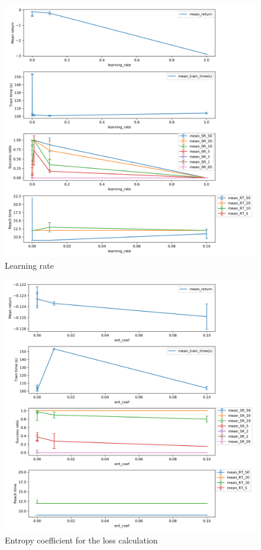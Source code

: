 \documentclass{article}
\begin{document}
\begin{figure}[H]
    \centering
    \includegraphics[width=\textwidth]{../ppo2_learning_rate.png}
\caption{Learning rate}
\end{figure}


\begin{figure}[H]
    \centering
    \includegraphics[width=\textwidth]{../ppo2_ent_coef.png}
\caption{Entropy coefficient for the loss calculation}
\end{figure}
\end{document}
